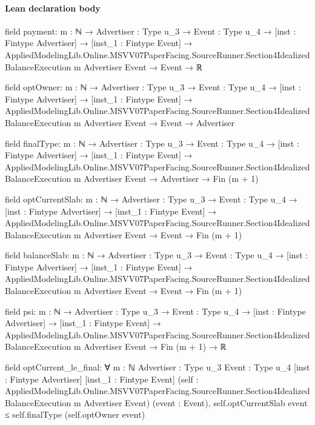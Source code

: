 \documentclass[10pt]{article}
\begin{document}
\paragraph{Lean declaration body}
\begin{ReviewVerbatim}
field payment:
{m : ℕ} →
  {Advertiser : Type u_3} →
    {Event : Type u_4} →
      [inst : Fintype Advertiser] →
        [inst_1 : Fintype Event] →
          AppliedModelingLib.Online.MSVV07PaperFacing.SourceRunner.Section4IdealizedBalanceExecution m Advertiser
              Event →
            Event → ℝ

field optOwner:
{m : ℕ} →
  {Advertiser : Type u_3} →
    {Event : Type u_4} →
      [inst : Fintype Advertiser] →
        [inst_1 : Fintype Event] →
          AppliedModelingLib.Online.MSVV07PaperFacing.SourceRunner.Section4IdealizedBalanceExecution m Advertiser
              Event →
            Event → Advertiser

field finalType:
{m : ℕ} →
  {Advertiser : Type u_3} →
    {Event : Type u_4} →
      [inst : Fintype Advertiser] →
        [inst_1 : Fintype Event] →
          AppliedModelingLib.Online.MSVV07PaperFacing.SourceRunner.Section4IdealizedBalanceExecution m Advertiser
              Event →
            Advertiser → Fin (m + 1)

field optCurrentSlab:
{m : ℕ} →
  {Advertiser : Type u_3} →
    {Event : Type u_4} →
      [inst : Fintype Advertiser] →
        [inst_1 : Fintype Event] →
          AppliedModelingLib.Online.MSVV07PaperFacing.SourceRunner.Section4IdealizedBalanceExecution m Advertiser
              Event →
            Event → Fin (m + 1)

field balanceSlab:
{m : ℕ} →
  {Advertiser : Type u_3} →
    {Event : Type u_4} →
      [inst : Fintype Advertiser] →
        [inst_1 : Fintype Event] →
          AppliedModelingLib.Online.MSVV07PaperFacing.SourceRunner.Section4IdealizedBalanceExecution m Advertiser
              Event →
            Event → Fin (m + 1)

field psi:
{m : ℕ} →
  {Advertiser : Type u_3} →
    {Event : Type u_4} →
      [inst : Fintype Advertiser] →
        [inst_1 : Fintype Event] →
          AppliedModelingLib.Online.MSVV07PaperFacing.SourceRunner.Section4IdealizedBalanceExecution m Advertiser
              Event →
            Fin (m + 1) → ℝ

field optCurrent_le_final:
∀ {m : ℕ} {Advertiser : Type u_3} {Event : Type u_4} [inst : Fintype Advertiser] [inst_1 : Fintype Event]
  (self : AppliedModelingLib.Online.MSVV07PaperFacing.SourceRunner.Section4IdealizedBalanceExecution m Advertiser Event)
  (event : Event), self.optCurrentSlab event ≤ self.finalType (self.optOwner event)


\end{ReviewVerbatim}
\end{document}
